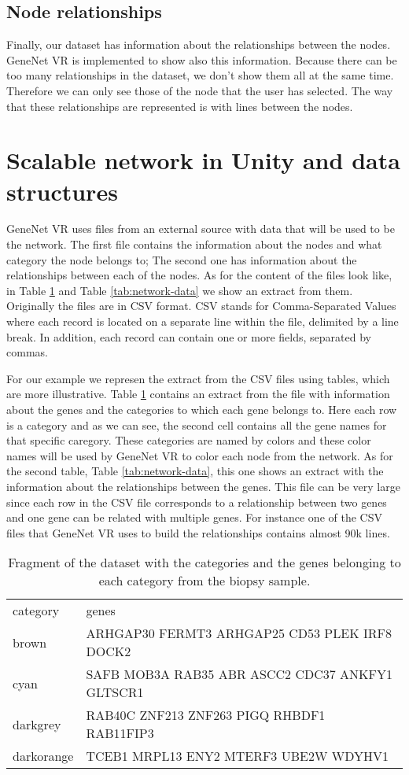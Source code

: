 \subsection{Node relationships}
Finally, our dataset has information about the relationships between the nodes. GeneNet VR is implemented to show also this information. Because there can be too many relationships in the dataset, we don't show them all at the same time. Therefore we can only see those of the node that the user has selected. The way that these relationships are represented is with lines between the nodes.


\section{Scalable network in Unity and data structures}
GeneNet VR uses files from an external source with data that will be used to be the network. The first file contains the information about the nodes and what category the node belongs to; The second one has information about the relationships between each of the nodes. As for the content of the files look like, in Table \ref{tab:categories-data} and Table \ref{tab:network-data} we show an extract from them. Originally the files are in CSV format. CSV\cite{csv} stands for Comma-Separated Values where each record is located on a separate line within the file, delimited by a line break. In addition, each record can contain one or more fields, separated by commas.

For our example we represen the extract from the CSV files using tables, which are more illustrative. Table \ref{tab:categories-data} contains an extract from the file with information about the genes and the categories to which each gene belongs to. Here each row is a category and as we can see, the second cell contains all the gene names for that specific caregory. These categories are named by colors and these color names will be used by GeneNet VR to color each node from the network. As for the second table, Table \ref{tab:network-data}, this one shows an extract with the information about the relationships between the genes. This file can be very large since each row in the CSV file corresponds to a relationship between two genes and one gene can be related with multiple genes. For instance one of the CSV files that GeneNet VR uses to build the relationships contains almost 90k lines.

\begin{table}[h!]
\centering
\begin{tabular}{ll}
\hline
category & genes          \\
brown   & ARHGAP30 FERMT3 ARHGAP25 CD53 PLEK IRF8 DOCK2\\
cyan  & SAFB MOB3A RAB35 ABR ASCC2 CDC37 ANKFY1 GLTSCR1\\
darkgrey  & RAB40C ZNF213 ZNF263 PIGQ RHBDF1 RAB11FIP3\\
darkorange  & TCEB1 MRPL13 ENY2 MTERF3 UBE2W WDYHV1\\
\hline
\end{tabular}
\caption{Fragment of the dataset with the categories and the genes belonging to each category from the biopsy sample.}
\label{tab:categories-data}
\end{table}

